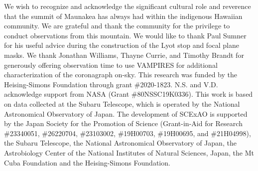 \documentclass[]{spie}  %
\begin{document}
We wish to recognize and acknowledge the significant cultural role and reverence that the summit of Maunakea has always had within the indigenous Hawaiian community. We are grateful and thank the community for the privilege to conduct observations from this mountain. We would like to thank Paul Sumner for his useful advice during the construction of the Lyot stop and focal plane masks. We thank Jonathan Williams, Thayne Currie, and Timothy Brandt for generously offering observation time to use VAMPIRES for additional characterization of the coronagraph on-sky. This research was funded by the Heising-Simons Foundation through grant \#2020-1823. N.S. and V.D. acknowledge support from NASA (Grant \#80NSSC19K0336). This work is based on data collected at the Subaru Telescope, which is operated by the National Astronomical Observatory of Japan. The development of SCExAO is supported by the Japan Society for the Promotion of Science (Grant-in-Aid for Research \#23340051, \#26220704, \#23103002, \#19H00703, \#19H00695, and \#21H04998), the Subaru Telescope, the National Astronomical Observatory of Japan, the Astrobiology Center of the National Institutes of Natural Sciences, Japan, the Mt Cuba Foundation and the Heising-Simons Foundation.


\end{document}
